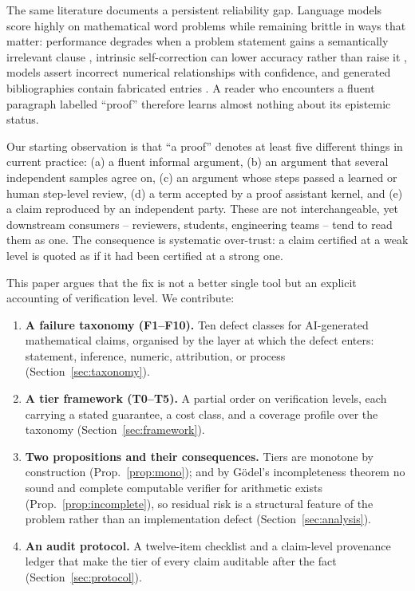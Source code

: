 \documentclass[11pt]{article}
\theoremstyle{plain}
\theoremstyle{definition}
\begin{document}
The same literature documents a persistent reliability gap. Language models score
highly on mathematical word problems \citep{cobbe2021gsm8k,hendrycks2021math} while
remaining brittle in ways that matter: performance degrades when a problem statement
gains a semantically irrelevant clause \citep{mirzadeh2024gsmsymbolic}, intrinsic
self-correction can lower accuracy rather than raise it
\citep{huang2024selfcorrect}, models assert incorrect numerical relationships with
confidence, and generated bibliographies contain fabricated entries
\citep{ji2023hallucination}. A reader who encounters a fluent paragraph labelled
``proof'' therefore learns almost nothing about its epistemic status.

Our starting observation is that ``a proof'' denotes at least five different things
in current practice: (a) a fluent informal argument, (b) an argument that several
independent samples agree on, (c) an argument whose steps passed a learned or human
step-level review, (d) a term accepted by a proof assistant kernel, and (e) a claim
reproduced by an independent party. These are not interchangeable, yet downstream
consumers -- reviewers, students, engineering teams -- tend to read them as one.
The consequence is systematic over-trust: a claim certified at a weak level is
quoted as if it had been certified at a strong one.

This paper argues that the fix is not a better single tool but an explicit accounting
of verification level. We contribute:

\begin{enumerate}[leftmargin=*,itemsep=2pt]
\item \textbf{A failure taxonomy (F1--F10).} Ten defect classes for AI-generated
mathematical claims, organised by the layer at which the defect enters: statement,
inference, numeric, attribution, or process (Section~\ref{sec:taxonomy}).
\item \textbf{A tier framework (T0--T5).} A partial order on verification levels,
each carrying a stated guarantee, a cost class, and a coverage profile over the
taxonomy (Section~\ref{sec:framework}).
\item \textbf{Two propositions and their consequences.} Tiers are monotone by
construction (Prop.~\ref{prop:mono}); and by G\"odel's incompleteness theorem no
sound and complete computable verifier for arithmetic exists
(Prop.~\ref{prop:incomplete}), so residual risk is a structural feature of the
problem rather than an implementation defect (Section~\ref{sec:analysis}).
\item \textbf{An audit protocol.} A twelve-item checklist and a claim-level
provenance ledger that make the tier of every claim auditable after the fact
(Section~\ref{sec:protocol}).
\end{enumerate}
\end{document}
